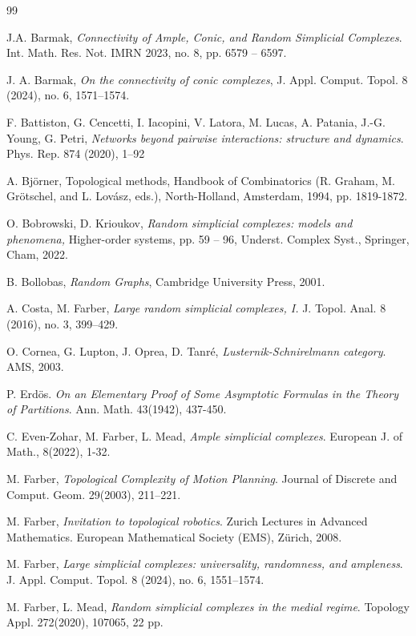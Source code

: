 \documentclass[10pt,a4paper]{amsart}
\begin{document}
\begin{thebibliography}{99}


 J.A. Barmak, \textit{Connectivity of Ample, Conic, and Random Simplicial Complexes}. Int. Math. Res. Not. IMRN 2023, no. 8, pp. 6579 -- 6597.

 J. A. Barmak, \textit{On the connectivity of conic complexes},  J. Appl. Comput. Topol. 8 (2024), no. 6, 1571–1574.

 F. Battiston, G. Cencetti, I. Iacopini, V. Latora, M. Lucas, A. Patania, J.-G. Young, G. Petri, \textit{Networks beyond pairwise interactions: structure and dynamics}. Phys. Rep. 874 (2020), 1–92

 A. Bj\"orner, Topological methods, Handbook of Combinatorics (R. Graham, M. Grötschel, and L. Lovász, eds.), North-Holland, Amsterdam, 1994, pp. 1819-1872.

 O. Bobrowski, D. Krioukov, 
\textit{Random simplicial complexes: models and phenomena,} Higher-order systems, pp. 59 -- 96,
Underst. Complex Syst., Springer, Cham, 2022. 

 B. Bollobas, \textit{Random Graphs}, Cambridge University Press, 2001.

 A. Costa, M. Farber, 
\textit{Large random simplicial complexes, I.}
J. Topol. Anal. 8 (2016), no. 3, 399–429.

 O. Cornea, G. Lupton, J. Oprea, D. Tanr\'e, \textit{Lusternik-Schnirelmann category}. AMS, 2003.

 P. Erd\"os. \textit{On an Elementary Proof of Some Asymptotic Formulas in the Theory of Partitions}. Ann. Math. 43(1942), 437-450.

 C. Even-Zohar, M. Farber, L. Mead, \textit{Ample simplicial complexes}. European J. of Math., 8(2022), 1-32.

 M. Farber, \textit{Topological Complexity of Motion Planning}. Journal of Discrete and Comput. Geom. 29(2003), 211–221.

 M. Farber, \textit{Invitation to topological robotics}. Zurich Lectures in Advanced Mathematics. European Mathematical Society (EMS), Zürich, 2008.

 M. Farber, \textit{Large simplicial complexes: universality, randomness, and ampleness}. 
 J. Appl. Comput. Topol. 8 (2024), no. 6, 1551–1574.



 M. Farber, L. Mead, \textit{Random simplicial complexes in the medial regime}. Topology Appl. 272(2020), 107065, 22 pp.


\end{thebibliography}
\end{document}

